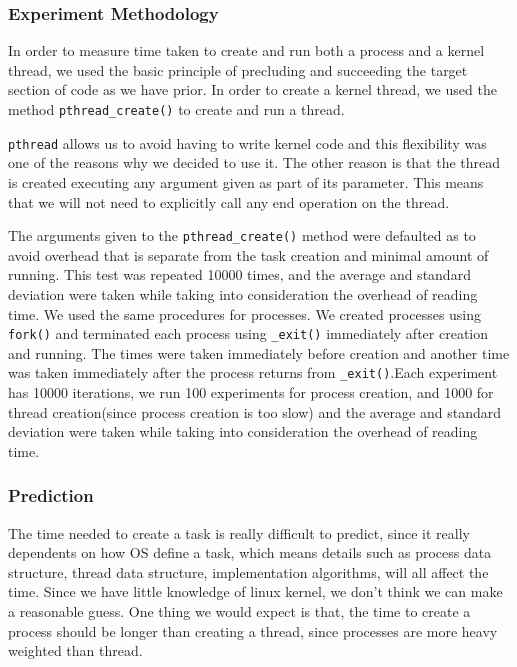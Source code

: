 \documentclass{article} %
\begin{document}
\subsubsection{Experiment Methodology}
In order to measure time taken to create and run both a process and a kernel
thread, we used the basic principle of precluding and succeeding the target
section of code as we have prior. In order to create a kernel thread, we used
the method \texttt{pthread\_create()} to create and run a thread.

\texttt{pthread} allows us to avoid having to write kernel code and this
flexibility was one of the reasons why we decided to use it. The other reason
is that the thread is created executing any argument given as part of its
parameter. This means that we will not need to explicitly call any end
operation on the thread.

The arguments given to the \texttt{pthread\_create()} method were defaulted as
to avoid overhead that is separate from the task creation and minimal amount
of running. This test was repeated 10000 times, and the average and standard
deviation were taken while taking into consideration the overhead of reading
time. We used the same procedures for processes. We created processes using
\texttt{fork()} and terminated each process using \texttt{\_exit()}
immediately after creation and running.  The times were taken immediately before creation and another time was taken immediately after the process returns from \texttt{\_exit()}.Each experiment has 10000 iterations,
we run 100 experiments for process creation, and 1000 for thread
creation(since process creation is too slow) and the average and standard
deviation were taken while taking into consideration the overhead of reading
time.

\subsubsection{Prediction}
The time needed to create a task is really difficult to predict, since it
really dependents on how OS define a task, which means details such as process
data structure, thread data structure, implementation algorithms, will all
affect the time. Since we have little knowledge of linux kernel, we don't
think we can make a reasonable guess. One thing we would expect is that, the
time to create a process should be longer than creating a thread, since
processes are more heavy weighted than thread.
\end{document}
